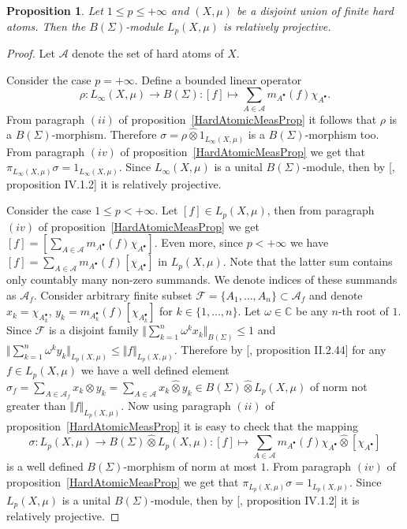 \documentclass[12pt]{article}
\newtheorem{proposition}[theorem]{Proposition}
\newcommand{\projtens}{\mathbin{\widehat{\otimes}}}
\begin{document}
\begin{proposition}\label{LpBSigmaModSuffCond} Let $1\leq p\leq +\infty$ and
    $(X,\mu)$ be a disjoint union of finite hard atoms. Then the
    $B(\Sigma)$-module $L_p(X,\mu)$ is relatively projective.
\end{proposition}
\begin{proof} Let $\mathcal{A}$ denote the set of hard atoms of $X$.

    Consider the case $p=+\infty$. Define a bounded linear operator
    $$
        \rho:L_\infty(X,\mu)\to B(\Sigma):
        [f]\mapsto\sum_{A\in\mathcal{A}}m_{A^\bullet}(f)\chi_{A^\bullet}.
    $$
    From paragraph $(ii)$ of proposition~\ref{HardAtomicMeasProp} it follows
    that $\rho$ is a $B(\Sigma)$-morphism. Therefore $\sigma=\rho\projtens
        1_{L_\infty(X,\mu)}$ is a $B(\Sigma)$-morphism too. From paragraph $(iv)$ of
    proposition~\ref{HardAtomicMeasProp} we get that
    $\pi_{L_\infty(X,\mu)}\sigma=1_{L_\infty(X,\mu)}$. Since $L_\infty(X,\mu)$
    is a unital $B(\Sigma)$-module, then by [\cite{HelHomolBanTopAlg},
            proposition IV.1.2] it is relatively projective.

    Consider the case $1\leq p<+\infty$. Let $[f]\in L_p(X,\mu)$, then from
    paragraph $(iv)$ of proposition~\ref{HardAtomicMeasProp} we get
    $[f]=[\sum_{A\in\mathcal{A}}m_{A^\bullet}(f)\chi_{A^\bullet}]$. Even more,
    since $p<+\infty$ we have
    $[f]=\sum_{A\in\mathcal{A}}m_{A^\bullet}(f)[\chi_{A^\bullet}]$ in
    $L_p(X,\mu)$. Note that the latter sum contains only countably many non-zero
    summands. We denote indices of these summands as $\mathcal{A}_f$. Consider
    arbitrary finite subset $\mathcal{F}=\{A_1,\ldots,A_n\}\subset\mathcal{A}_f$
    and denote $x_k=\chi_{A_k^\bullet}$,
    $y_k=m_{A_k^\bullet}(f)[\chi_{A_k^\bullet}]$ for $k\in \{1,\ldots,n\}$. Let
    $\omega\in\mathbb{C}$ be any $n$-th root of $1$. Since $\mathcal{F}$ is a
    disjoint family $\Vert\sum_{k=1}^n \omega^k x_k\Vert_{B(\Sigma)}\leq 1$ and
    $\Vert \sum_{k=1}^n\omega^k y_k\Vert_{L_p(X,\mu)}\leq\Vert
        f\Vert_{L_p(X,\mu)}$. Therefore by [\cite{HelHomolBanTopAlg}, proposition
            II.2.44] for any $f\in L_p(X,\mu)$ we have a well defined element
    $\sigma_f=\sum_{A\in\mathcal{A}_f} x_k\projtens y_k=\sum_{A\in\mathcal{A}}
        x_k\projtens y_k\in B(\Sigma)\projtens L_p(X,\mu)$ of norm not greater than
    $\Vert f\Vert_{L_p(X,\mu)}$. Now using paragraph $(ii)$ of
    proposition~\ref{HardAtomicMeasProp} it is easy to check that the mapping
    $$
        \sigma: L_p(X,\mu)\to B(\Sigma)\projtens L_p(X,\mu):
        [f]\mapsto \sum_{A\in\mathcal{A}}
        m_{A^\bullet}(f)\chi_{A^\bullet}\projtens[\chi_{A^\bullet}]
    $$
    is a well defined $B(\Sigma)$-morphism of norm at most $1$. From paragraph
    $(iv)$ of proposition~\ref{HardAtomicMeasProp} we get that
    $\pi_{L_p(X,\mu)}\sigma=1_{L_p(X,\mu)}$. Since $L_p(X,\mu)$ is a unital
    $B(\Sigma)$-module, then by [\cite{HelHomolBanTopAlg}, proposition IV.1.2]
    it is relatively projective.
\end{proof}
\end{document}
